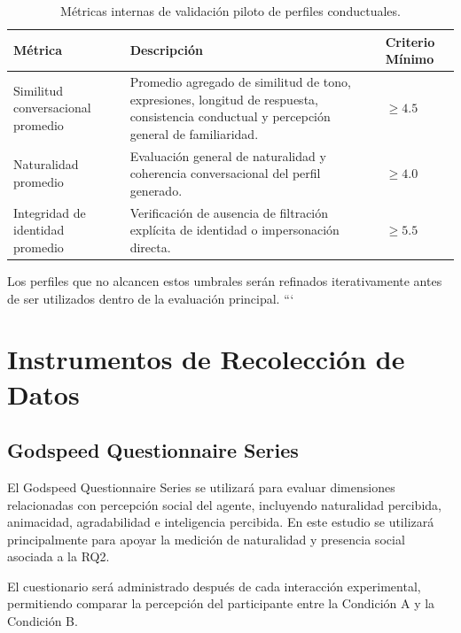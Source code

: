 \documentclass[12pt]{article}
\begin{document}
\begin{table}[H]
\centering
\small
\renewcommand{\arraystretch}{1.2}

\begin{tabular}{p{5cm} p{5cm} p{3cm}}
\toprule
\textbf{Métrica} & \textbf{Descripción} & \textbf{Criterio Mínimo} \\
\midrule

Similitud conversacional promedio
& Promedio agregado de similitud de tono, expresiones, longitud de respuesta, consistencia conductual y percepción general de familiaridad.
& $\geq 4.5$ \\

Naturalidad promedio
& Evaluación general de naturalidad y coherencia conversacional del perfil generado.
& $\geq 4.0$ \\

Integridad de identidad promedio
& Verificación de ausencia de filtración explícita de identidad o impersonación directa.
& $\geq 5.5$ \\

\bottomrule
\end{tabular}

\caption{Métricas internas de validación piloto de perfiles conductuales.}

\end{table}

Los perfiles que no alcancen estos umbrales serán refinados iterativamente antes de ser utilizados dentro de la evaluación principal.
```


\section{Instrumentos de Recolección de Datos}

\subsection{Godspeed Questionnaire Series}

El Godspeed Questionnaire Series se utilizará para evaluar dimensiones relacionadas con percepción social del agente, incluyendo naturalidad percibida, animacidad, agradabilidad e inteligencia percibida. En este estudio se utilizará principalmente para apoyar la medición de naturalidad y presencia social asociada a la RQ2.

El cuestionario será administrado después de cada interacción experimental, permitiendo comparar la percepción del participante entre la Condición A y la Condición B.
\end{document}
